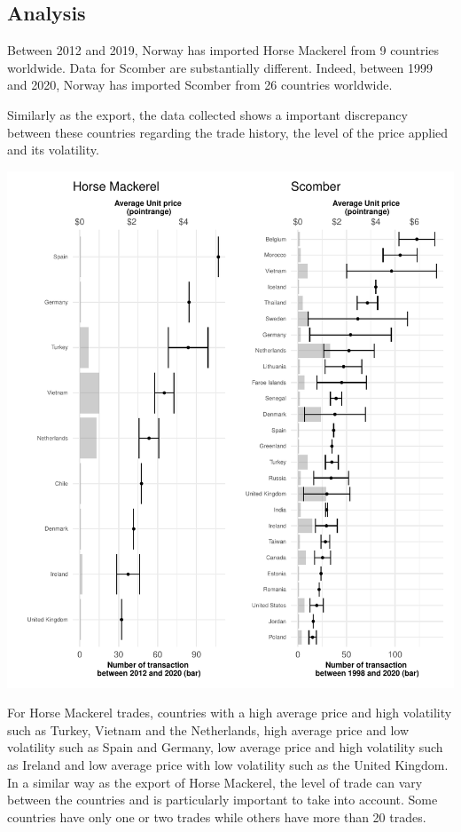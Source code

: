 \documentclass[10,a4paperpaper,]{article}
\begin{document}
\subsection{Analysis}

Between 2012 and 2019, Norway has imported Horse Mackerel from 9
countries worldwide. Data for Scomber are substantially different.
Indeed, between 1999 and 2020, Norway has imported Scomber from 26
countries worldwide.

Similarly as the export, the data collected shows a important
discrepancy between these countries regarding the trade history, the
level of the price applied and its volatility.

\includegraphics{report_files/figure-latex/unnamed-chunk-13-1.pdf}

For Horse Mackerel trades, countries with a high average price and high
volatility such as Turkey, Vietnam and the Netherlands, high average
price and low volatility such as Spain and Germany, low average price
and high volatility such as Ireland and low average price with low
volatility such as the United Kingdom. In a similar way as the export of
Horse Mackerel, the level of trade can vary between the countries and is
particularly important to take into account. Some countries have only
one or two trades while others have more than 20 trades.
\end{document}

